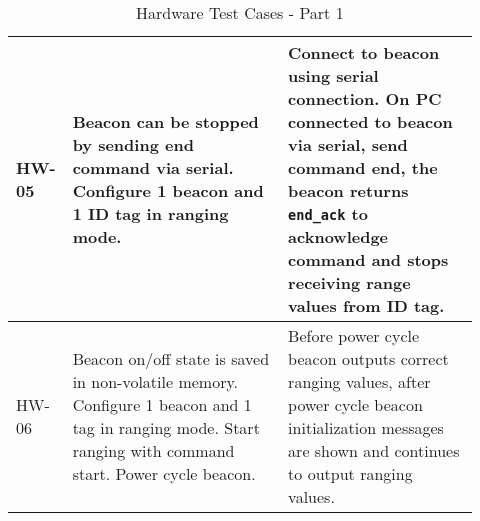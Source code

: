 \begin{table}[h!]
\begin{tabular}{|p{0.07\linewidth}|p{0.45\linewidth}|p{0.40\linewidth}|}
	\hline  
	HW-05
	& Beacon can be stopped by sending end command via serial. Configure 1 beacon and 1 ID tag in ranging mode.
	& Connect to beacon using serial connection.
	On PC connected to beacon via serial, send command end, the beacon returns \texttt{end\_ack} to acknowledge command and stops receiving range values from ID tag.\\
	
	\hline  
	HW-06
	& Beacon on/off state is saved in non-volatile memory. Configure 1 beacon and 1 tag in ranging mode. Start ranging with command start. Power cycle beacon.
	& Before power cycle beacon outputs correct ranging values, after power cycle beacon initialization messages are shown and continues to output ranging values.\\

    \hline
    \end{tabular}
    \caption{Hardware Test Cases - Part 1}
\end{table}

